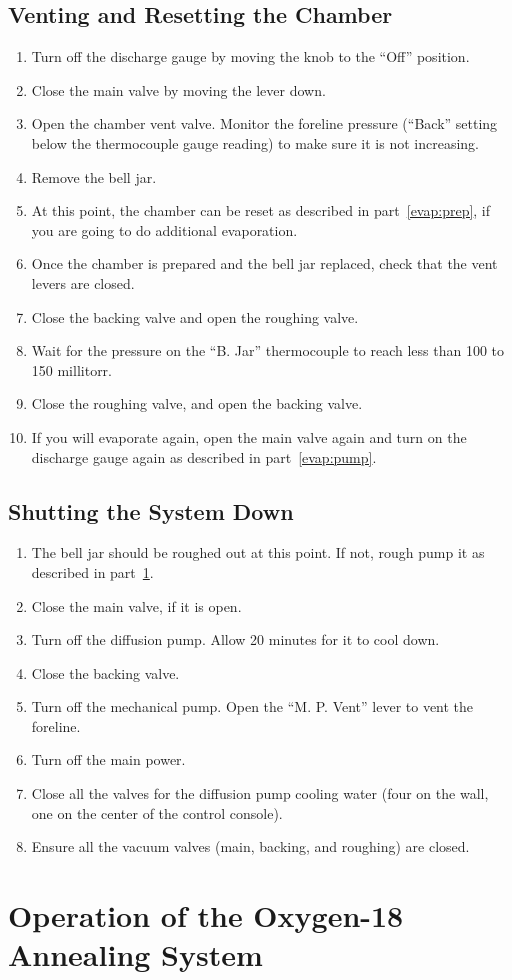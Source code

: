 \documentclass{thesis-umich}
\begin{document}
\section{Venting and Resetting the Chamber}
\label{evap:reset}
\begin{enumerate}
	\item Turn off the discharge gauge by moving the knob to the ``Off'' position.
	\item Close the main valve by moving the lever down.
	\item Open the chamber vent valve. Monitor the foreline pressure (``Back'' setting below the thermocouple gauge reading) to make sure it is not increasing.
	\item Remove the bell jar.
	\item At this point, the chamber can be reset as described in part~\ref{evap:prep}, if you are going to do additional evaporation.
	\item Once the chamber is prepared and the bell jar replaced, check that the vent levers are closed.
	\item Close the backing valve and open the roughing valve.
	\item Wait for the pressure on the ``B. Jar'' thermocouple to reach less than 100 to 150 millitorr.
	\item Close the roughing valve, and open the backing valve.
	\item If you will evaporate again, open the main valve again and turn on the discharge gauge again as described in part~\ref{evap:pump}.
\end{enumerate}

\section{Shutting the System Down}
\begin{enumerate}
	\item The bell jar should be roughed out at this point. If not, rough pump it as described in part~\ref{evap:reset}.
	\item Close the main valve, if it is open.
	\item Turn off the diffusion pump. Allow 20 minutes for it to cool down.
	\item Close the backing valve.
	\item Turn off the mechanical pump. Open the ``M. P. Vent'' lever to vent the foreline.
	\item Turn off the main power.
	\item Close all the valves for the diffusion pump cooling water (four on the wall, one on the center of the control console).
	\item Ensure all the vacuum valves (main, backing, and roughing) are closed.
\end{enumerate}

\chapter{Operation of the Oxygen-18 Annealing System}




\end{document}
